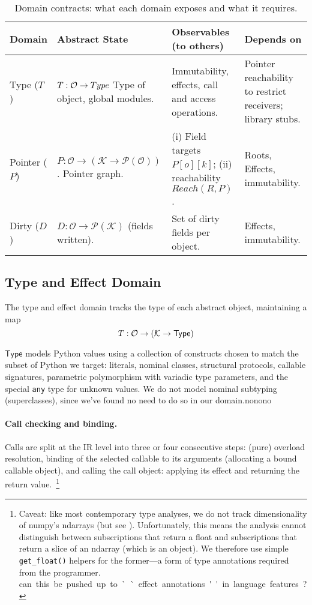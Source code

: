 \begin{table}[t]
\centering
\small
\begin{tabular}{p{15mm}p{36mm}p{37mm}p{40mm}}
\toprule
\textbf{Domain} & \textbf{Abstract State} & \textbf{Observables (to others)} & \textbf{Depends on} \\
\midrule
Type ($T$) &
  $T:\mathcal O\to \mathcal \mathsf{Type}$
  Type of object, global modules. &
  Immutability, effects, call and access operations. &
  Pointer reachability to restrict receivers; library stubs. \\
\addlinespace
Pointer ($P$) &
  $P:\mathcal O\to(\mathcal K\to \mathcal P(\mathcal O))$.
  Pointer graph.&
  (i) Field targets $P[o][k]$; (ii) reachability $Reach(R,P)$. &
  Roots, Effects, immutability. \\
\addlinespace
Dirty ($D$) &
  $D:\mathcal O\to \mathcal P(\mathcal K)$ (fields written). &
  Set of dirty fields per object. &
  Effects,  immutability. \\
\bottomrule
\end{tabular}
\caption{Domain contracts: what each domain exposes and what it requires.}
\label{tab:contracts}
\end{table}

\subsection{Type and Effect Domain}
The type and effect domain tracks the type of each abstract object, maintaining a map \[T : \mathcal{O} \to (\mathcal{K} \to \mathsf{Type})\] 

$\mathsf{Type}$ models Python values using a collection of constructs chosen to match the subset of Python we target: literals, nominal classes, structural protocols, callable signatures, parametric polymorphism with variadic type parameters, and the special \texttt{any} type for unknown values. We do not model nominal subtyping (superclasses), since we've found no need to do so in our domain.\si{nonono}

\paragraph{Call checking and binding.}
Calls are split at the IR level into three or four consecutive steps: (pure) overload resolution, binding of the selected callable to its arguments (allocating a bound callable object), and calling the call object: applying its effect and returning the return value.~\footnote{Caveat: like most contemporary type analyses, we do not track dimensionality of numpy's \textsf{ndarrays} (but see \cite{liu2020type}). Unfortunately, this means the analysis cannot distinguish between subscriptions that return a \textsf{float} and subscriptions that return a slice of an \textsf{ndarray} (which is an object). We therefore use simple \texttt{get\_float()} helpers for the former---a form of type annotations required from the programmer.
\si{can this be pushed up to ``effect annotations'' in language features?}}

